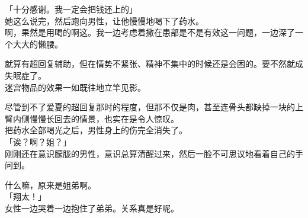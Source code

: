 「十分感谢。我一定会把钱还上的」\\

她这么说完，然后跑向男性，让他慢慢地喝下了药水。\\

啊，果然是用喝的啊这。我一边考虑着撒在患部是不是有效这一问题，一边深了一个大大的懒腰。

就算有超回复辅助，但在情势不紧张、精神不集中的时候还是会困的。要不然就成失眠症了。\\

迷宫物品的效果一如既往地立竿见影。

尽管到不了爱夏的超回复那时的程度，但那不仅是肉，甚至连骨头都缺掉一块的上臂内侧慢慢长回去的情景，也实在是令人惊叹。\\

把药水全部喝光之后，男性身上的伤完全消失了。\\

「诶？啊？姐？」\\

刚刚还在意识朦胧的男性，意识总算清醒过来，然后一脸不可思议地看着自己的手问到。

什么嘛，原来是姐弟啊。\\

「翔太！」\\

女性一边哭着一边抱住了弟弟。关系真是好呢。\\

